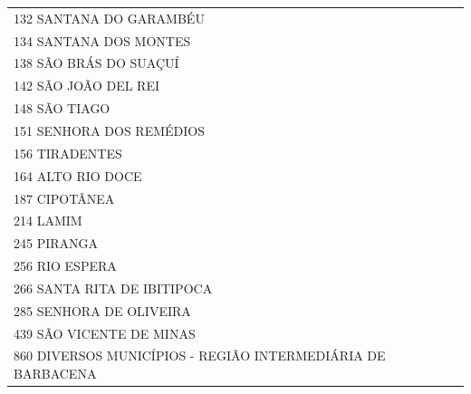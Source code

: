 \documentclass{article}
\begin{document}
\begin{longtable}[c]{m{18cm}}
\multicolumn{1}{l}{ \hspace{2em} 132 SANTANA DO GARAMBÉU } \\
\multicolumn{1}{l}{ \hspace{2em} 134 SANTANA DOS MONTES } \\
\multicolumn{1}{l}{ \hspace{2em} 138 SÃO BRÁS DO SUAÇUÍ } \\
\multicolumn{1}{l}{ \hspace{2em} 142 SÃO JOÃO DEL REI } \\
\multicolumn{1}{l}{ \hspace{2em} 148 SÃO TIAGO } \\
\multicolumn{1}{l}{ \hspace{2em} 151 SENHORA DOS REMÉDIOS } \\
\multicolumn{1}{l}{ \hspace{2em} 156 TIRADENTES } \\
\multicolumn{1}{l}{ \hspace{2em} 164 ALTO RIO DOCE } \\
\multicolumn{1}{l}{ \hspace{2em} 187 CIPOTÂNEA } \\
\multicolumn{1}{l}{ \hspace{2em} 214 LAMIM } \\
\multicolumn{1}{l}{ \hspace{2em} 245 PIRANGA } \\
\multicolumn{1}{l}{ \hspace{2em} 256 RIO ESPERA } \\
\multicolumn{1}{l}{ \hspace{2em} 266 SANTA RITA DE IBITIPOCA } \\
\multicolumn{1}{l}{ \hspace{2em} 285 SENHORA DE OLIVEIRA } \\
\multicolumn{1}{l}{ \hspace{2em} 439 SÃO VICENTE DE MINAS } \\
\multicolumn{1}{l}{ \hspace{2em} 860 DIVERSOS MUNICÍPIOS - REGIÃO INTERMEDIÁRIA DE BARBACENA } \\
\end{longtable}
\newpage
\end{document}
